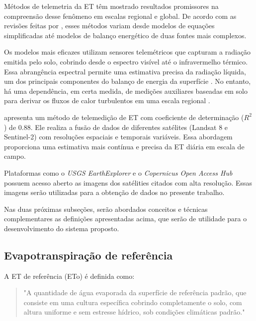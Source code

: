Métodos de telemetria da ET têm mostrado resultados promissores na compreensão desse fenômeno em escalas regional e global. De acordo com as revisões feitas por \textcite{Zhao_evapotranspiration_med2009, Zhang_evapotranspiration_med2016}, esses métodos variam desde modelos de equações simplificadas até modelos de balanço energético de duas fontes mais complexos. 

Os modelos mais eficazes utilizam sensores telemétricos que capturam a radiação emitida pelo solo, cobrindo desde o espectro visível até o infravermelho térmico. Essa abrangência espectral permite uma estimativa precisa da radiação líquida, um dos principais componentes do balanço de energia da superfície \parencite{Zhao_evapotranspiration_med2009}. No entanto, há uma dependência, em certa medida, de medições auxiliares baseadas em solo para derivar os fluxos de calor turbulentos em uma escala regional \parencite{Zhang_evapotranspiration_med2016}.

\textcite{Yang_evapotranspiration_med2022} apresenta um método de telemedição de ET com coeficiente de determinação ($R^2$) de 0.88. Ele realiza a fusão de dados de diferentes satélites (Landsat 8 e Sentinel-2) com resoluções espaciais e temporais variáveis. Essa abordagem proporciona uma estimativa mais contínua e precisa da ET diária em escala de campo. 

Plataformas como o \textit{USGS EarthExplorer} e o \textit{Copernicus Open Access Hub} possuem acesso aberto as imagens dos satélities citados com alta resolução. Essas imagens serão utilizadas para a obtenção de dados no presente trabalho.

Nas duas próximas subseções, serão abordados conceitos e técnicas complementares as definições apresentadas acima, que serão de utilidade para o desenvolvimento do sistema proposto.

\subsection{Evapotranspiração de referência}

A ET de referência (ETo) é definida como:

\begin{quote}
  "A quantidade de água evaporada da superfície de referência padrão, que consiste em uma cultura específica cobrindo completamente o solo, com altura uniforme e sem estresse hídrico, sob condições climáticas padrão." \parencite{Allen_evapotranspiration1998}
\end{quote}

